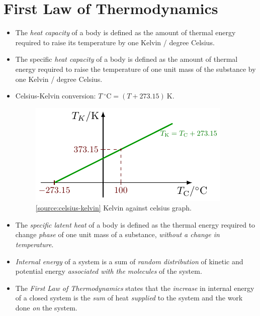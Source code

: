 \documentclass[oneside]{book}
\begin{document}
\chapter{First Law of Thermodynamics}
\begin{itemize}
    \item The \emph{heat capacity} of a body is defined as the amount of thermal energy required to raise its temperature by one Kelvin / degree Celsius.
    \item The specific \emph{heat capacity} of a body is defined as the amount of thermal energy required to raise the temperature of one unit mass of the substance by one Kelvin / degree Celsius.
    \item Celsius-Kelvin conversion: \(T\ {^\circ}\text{C}=(T+273.15)\ \text{K}\). 
    \begin{figure}[H]
        \centering
        \includegraphics{../images/Celcius-Kelvin/Celcius-Kelvin.pdf}
        \caption{\ref{source:celsius-kelvin} Kelvin against celsius graph.}
        \label{fig:celsius-kelvin}
    \end{figure}
    \item The \emph{specific latent heat} of a body is defined as the thermal energy required to change \emph{phase} of one unit mass of a substance, \emph{without a change in temperature}.
    \item \emph{Internal energy} of a system is a sum of \emph{random distribution} of kinetic and potential energy \emph{associated with the molecules} of the system.
    \item The \emph{First Law of Thermodynamics} states that the \emph{increase} in internal energy of a closed system is the \emph{sum} of heat \emph{supplied} to the system and the work done \emph{on} the system. 
\end{itemize}
\end{document}
